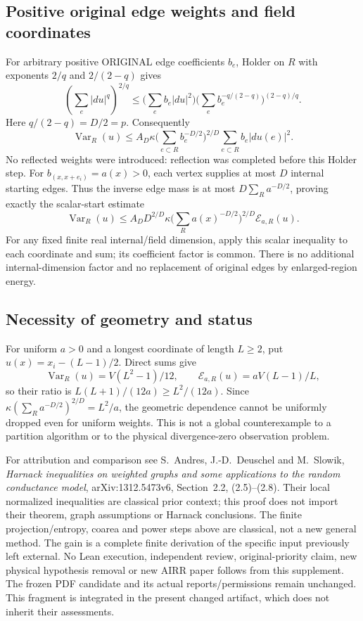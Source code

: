 \subsection{Positive original edge weights and field coordinates}
For arbitrary positive ORIGINAL edge coefficients $b_e$, Holder on $R$
with exponents $2/q$ and $2/(2-q)$ gives
\[
 \left(\sum_e|du|^q\right)^{2/q}
 \leq\Big(\sum_e b_e|du|^2\Big)
 \Big(\sum_e b_e^{-q/(2-q)}\Big)^{(2-q)/q}.
\]
Here $q/(2-q)=D/2=p$. Consequently
\begin{equation}\label{eq:rectangle-weighted-derived}
 \operatorname{Var}_R(u)\leq A_D\kappa
 \Big(\sum_{e\subset R}b_e^{-D/2}\Big)^{2/D}
 \sum_{e\subset R}b_e|du(e)|^2.
\end{equation}
No reflected weights were introduced: reflection was completed before
this Holder step. For $b_{(x,x+e_i)}=a(x)>0$, each vertex supplies at most
$D$ internal starting edges. Thus the inverse edge mass is at most
$D\sum_Ra^{-D/2}$, proving exactly the scalar-start estimate
\[
 \operatorname{Var}_R(u)\leq A_D D^{2/D}\kappa
 \Big(\sum_Ra(x)^{-D/2}\Big)^{2/D}\mathcal E_{a,R}(u).
\]
For any fixed finite real internal/field dimension, apply this scalar
inequality to each coordinate and sum; its coefficient factor is common.
There is no additional internal-dimension factor and no replacement of
original edges by enlarged-region energy.

\subsection{Necessity of geometry and status}
For uniform $a>0$ and a longest coordinate of length $L\geq2$, put
$u(x)=x_i-(L-1)/2$. Direct sums give
\[
 \operatorname{Var}_R(u)=V(L^2-1)/12,\qquad
 \mathcal E_{a,R}(u)=aV(L-1)/L,
\]
so their ratio is $L(L+1)/(12a)\geq L^2/(12a)$. Since
$\kappa(\sum_Ra^{-D/2})^{2/D}=L^2/a$, the geometric dependence cannot
be uniformly dropped even for uniform weights. This is not a global
counterexample to a partition algorithm or to the physical divergence-zero
observation problem.

For attribution and comparison see S.~Andres, J.-D.~Deuschel and M.~Slowik,
\emph{Harnack inequalities on weighted graphs and some applications to the
random conductance model}, arXiv:1312.5473v6, Section~2.2, (2.5)--(2.8).
Their local normalized inequalities are classical prior context; this
proof does not import their theorem, graph assumptions or Harnack conclusions.
The finite projection/entropy, coarea and power steps above are classical,
not a new general method. The gain is a complete finite derivation of the
specific input previously left external. No Lean execution, independent
review, original-priority claim, new physical hypothesis removal or new
AIRR paper follows from this supplement. The frozen PDF candidate and its
actual reports/permissions remain unchanged. This fragment is integrated
in the present changed artifact, which does not inherit their assessments.
